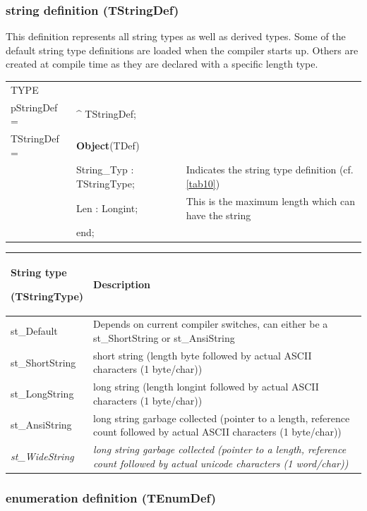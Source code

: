 \documentclass [a4paper,12pt]{article}
\begin{document}
\subsubsection{string definition (TStringDef)}
\label{subsubsec:string}

This definition represents all string types as well as derived types. Some
of the default string type definitions are loaded when the compiler starts
up. Others are created at compile time as they are declared with a specific
length type.

\begin{tabular*}{6.5in}{|l@{\extracolsep{\fill}}lp{9cm}|}
\hline
\textsf{TYPE}& & \\
\xspace pStringDef = & \^{}  TStringDef; & \\
\xspace \textsf{TStringDef} = & \textbf{Object}(TDef) & \\
&\textsf{String{\_}Typ : TStringType;}&
	Indicates the string type definition (cf. \ref{tab10}) \\
&\textsf{Len : Longint;}&
	This is the maximum length which can have the string \\
&\textsf{end;}& \\
\hline
\end{tabular*}

\begin{longtable}{|l|p{10cm}|}
\hline
String type \par (TStringType) & Description \\
\hline
\endhead
\hline
\endfoot
\textsf{st{\_}Default}&
	Depends on current compiler switches, can either be a
	st{\_}ShortString or st{\_}AnsiString \\
\textsf{st{\_}ShortString}&
	short string (length byte followed by actual ASCII characters (1
	byte/char)) \\
\textsf{st{\_}LongString}&
	long string (length longint followed by actual ASCII characters (1
	byte/char)) \\
\textsf{st{\_}AnsiString}&
	long string garbage collected (pointer to a length, reference count
	followed by actual ASCII characters (1 byte/char)) \\
\textsf{\textit{st{\_}WideString}}&
	\textit{long string garbage collected (pointer to a length,
	reference count followed by actual unicode characters (1
	word/char))} \\
\end{longtable}

\subsubsection{enumeration definition (TEnumDef)}
\label{subsubsec:mylabel9}
\end{document}
